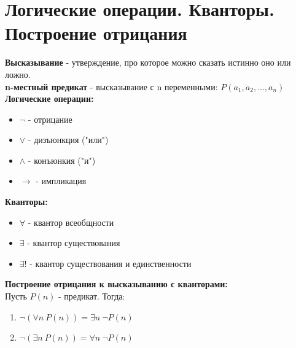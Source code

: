 \documentclass[12pt]{article}
\begin{document}
\newpage


\section{Логические операции. Кванторы. Построение отрицания}
    \textbf{Высказывание} - утверждение, про которое можно сказать истинно оно или ложно. \\ 
    \textbf{n-местный предикат} - высказывание с n переменными: $P(a_1, a_2, ..., a_n)$ \\
    \textbf{Логические операции: } 
    \begin{itemize}[itemsep=0mm, topsep=0mm, partopsep=0mm]
        \item $\neg$ - отрицание
        \item $\vee$ - дизъюнкция ("или")
        \item $\wedge$  - конъюнкия ("и")
        \item $\to$ - импликация
    \end{itemize}
    \textbf{Кванторы: } 
    \begin{itemize}[itemsep=0mm, topsep=0mm, partopsep=0mm]
        \item $\forall$ - квантор всеобщности
        \item $\exists$ - квантор существования
        \item $\exists !$  - квантор существования и единственности
    \end{itemize}
    \textbf{Построение отрицания к высказыванию с кванторами:}
    \\ Пусть $P(n)$ - предикат. Тогда:
    \begin{enumerate}[itemsep=0mm, topsep=0mm, partopsep=0mm]
        \item $\neg (\forall n \ P(n)) = \exists n \ \neg P(n)$
        \item $\neg (\exists n \ P(n)) = \forall n \ \neg P(n)$
    \end{enumerate} 
\end{document}
